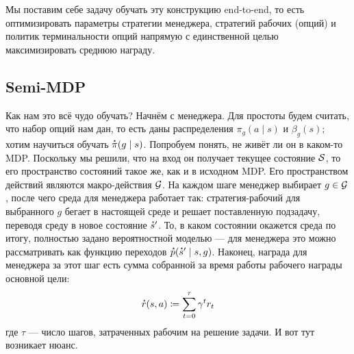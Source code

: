 Мы поставим себе задачу обучать эту конструкцию end-to-end, то есть оптимизировать параметры стратегии менеджера, стратегий рабочих (опций) и политик терминальности опций напрямую с единственной целью максимизировать среднюю награду.


\subsection{Semi-MDP}

Как нам это всё чудо обучать? Начнём с менеджера. Для простоты будем считать, что набор опций нам дан, то есть даны распределения $\pi_g(a \mid s)$ и $\beta_g(s)$; хотим научиться обучать $\accentset{\star}{\pi}(g \mid s)$. Попробуем понять, не живёт ли он в каком-то MDP. Поскольку мы решили, что на вход он получает текущее состояние $\mathcal{S}$, то его пространство состояний такое же, как и в исходном MDP. Его пространством действий являются макро-действия $\mathcal{G}$. На каждом шаге менеджер выбирает $g \in \mathcal{G}$, после чего среда для менеджера работает так: стратегия-рабочий для выбранного $g$ бегает в настоящей среде и решает поставленную подзадачу, переводя среду в новое состояние $\accentset{\star}{s}'$. То, в каком состоянии окажется среда по итогу, полностью задано вероятностной моделью --- для менеджера это можно рассматривать как функцию переходов $\accentset{\star}{p}(\accentset{\star}{s}' \mid s, g)$. Наконец, награда для менеджера за этот шаг есть сумма собранной за время работы рабочего награды основной цели:
\begin{equation}\label{managerreward}
\accentset{\star}{r}(s, a) \coloneqq \sum_{t=0}^{\tau} \gamma^t r_t
\end{equation}
где $\tau$ --- число шагов, затраченных рабочим на решение задачи. И вот тут возникает нюанс.

